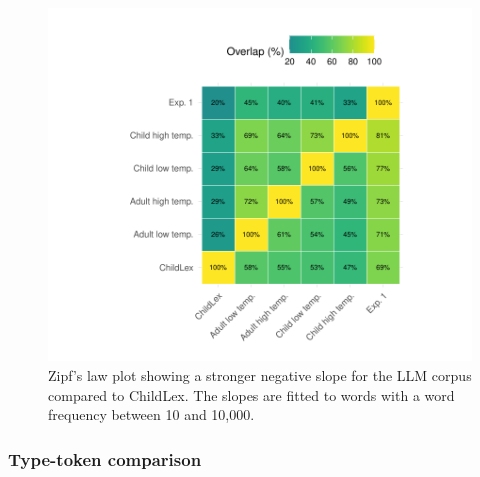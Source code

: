 \documentclass[doc, a4paper]{apa7}
\begin{document}
\begin{figure}[!htbp]
  \centering
    \includegraphics[width = \textwidth]{figures/heatmap.pdf}
    \caption{Zipf's law plot showing a stronger negative slope for the LLM corpus compared to ChildLex. The slopes are fitted to words with a word frequency between 10 and 10,000. }
    \label{fig:heatmap}
\end{figure}

\clearpage


\subsubsection{Type-token comparison}
\end{document}

